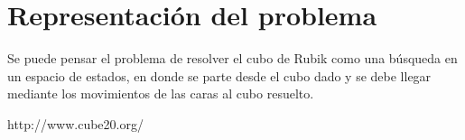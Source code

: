 \documentclass[11pt,a4paper]{article}
\begin{document}
\section{Representación del problema}

Se puede pensar el problema de resolver el cubo de Rubik como una búsqueda en un espacio de estados, en donde se parte desde el cubo dado y se debe llegar mediante los movimientos de las caras al cubo resuelto. 





\begin{thebibliography}{9}

  http://www.cube20.org/
  
\end{thebibliography}
\end{document}
